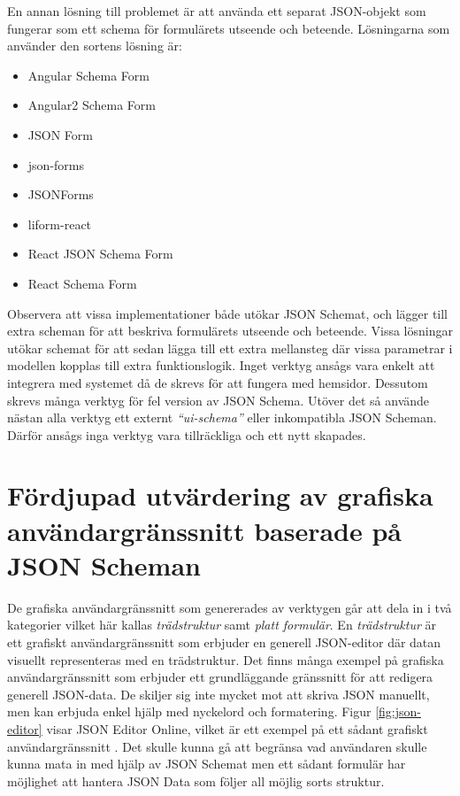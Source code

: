 En annan lösning till problemet är att använda ett separat JSON-objekt som fungerar som ett schema för formulärets utseende och beteende. Lösningarna som använder den sortens lösning är:
\begin{itemize}
	\item Angular Schema Form \cite{Textalk}
	\item Angular2 Schema Form \cite{MakinaCorpus}
	\item JSON Form \cite{Joshfire}
	\item json-forms \cite{Brutusin.org}
	\item JSONForms \cite{EclipseSource}
	\item liform-react \cite{NachoMartin}
	\item React JSON Schema Form \cite{MozillaServices}
	\item React Schema Form \cite{NetworkNewTechnologiesInc.}
\end{itemize}

Observera att vissa implementationer både utökar JSON Schemat, och lägger till extra scheman för att beskriva formulärets utseende och beteende. Vissa lösningar utökar schemat för att sedan lägga till ett extra mellansteg där vissa parametrar i modellen kopplas till extra funktionslogik. Inget verktyg ansågs vara enkelt att integrera med systemet då de skrevs för att fungera med hemsidor. Dessutom skrevs många verktyg för fel version av JSON Schema. Utöver det så använde nästan alla verktyg ett externt \textit{``ui-schema''} eller inkompatibla JSON Scheman. Därför ansågs inga verktyg vara tillräckliga och ett nytt skapades.

\section{Fördjupad utvärdering av grafiska användargränssnitt baserade på JSON Scheman}
\label{sec:forarbete:kategorisering}

De grafiska användargränssnitt som genererades av verktygen går att dela in i två kategorier vilket här kallas \textit{trädstruktur} samt \textit{platt formulär}. En \textit{trädstruktur} är ett grafiskt användargränssnitt som erbjuder en generell JSON-editor där datan visuellt representeras med en trädstruktur. Det finns många exempel på grafiska användargränssnitt som erbjuder ett grundläggande gränssnitt för att redigera generell JSON-data. De skiljer sig inte mycket mot att skriva JSON manuellt, men kan erbjuda enkel hjälp med nyckelord och formatering. Figur \ref{fig:json-editor} visar JSON Editor Online, vilket är ett exempel på ett sådant grafiskt användargränssnitt \cite{DeJong2018}. Det skulle kunna gå att begränsa vad användaren skulle kunna mata in med hjälp av JSON Schemat men ett sådant formulär har möjlighet att hantera JSON Data som följer all möjlig sorts struktur.

